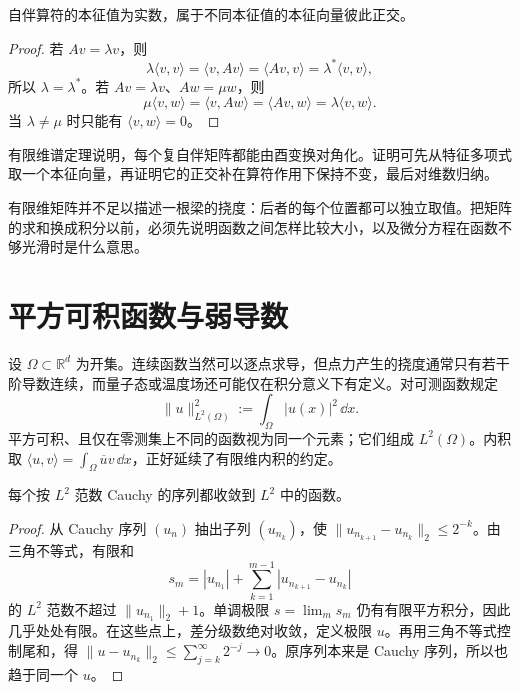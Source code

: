 \begin{proposition}[自伴算符的基本谱性质]
自伴算符的本征值为实数，属于不同本征值的本征向量彼此正交。
\end{proposition}

\begin{proof}
若 \(Av=\lambda v\)，则
\[
\lambda\langle v,v\rangle
=\langle v,Av\rangle
=\langle Av,v\rangle
=\lambda^*\langle v,v\rangle,
\]
所以 \(\lambda=\lambda^*\)。若 \(Av=\lambda v\)、\(Aw=\mu w\)，则
\[
\mu\langle v,w\rangle
=\langle v,Aw\rangle
=\langle Av,w\rangle
=\lambda\langle v,w\rangle.
\]
当 \(\lambda\ne\mu\) 时只能有 \(\langle v,w\rangle=0\)。
\end{proof}

有限维谱定理说明，每个复自伴矩阵都能由酉变换对角化。证明可先从特征多项式取一个本征向量，再证明它的正交补在算符作用下保持不变，最后对维数归纳。

有限维矩阵并不足以描述一根梁的挠度：后者的每个位置都可以独立取值。把矩阵的求和换成积分以前，必须先说明函数之间怎样比较大小，以及微分方程在函数不够光滑时是什么意思。

\section{平方可积函数与弱导数}
\label{sec:advanced-weak-derivative}

设 \(\Omega\subset\mathbb R^d\) 为开集。连续函数当然可以逐点求导，但点力产生的挠度通常只有若干阶导数连续，而量子态或温度场还可能仅在积分意义下有定义。对可测函数规定
\[
 \|u\|_{L^2(\Omega)}^2:=\int_\Omega |u(x)|^2\,\dd x.
\]
平方可积、且仅在零测集上不同的函数视为同一个元素；它们组成 \(L^2(\Omega)\)。内积取
\(\langle u,v\rangle=\int_\Omega\overline u v\,\dd x\)，正好延续了有限维内积的约定。

\begin{proposition}[\(L^2\) 的完备性]
每个按 \(L^2\) 范数 Cauchy 的序列都收敛到 \(L^2\) 中的函数。
\end{proposition}

\begin{proof}
从 Cauchy 序列 \((u_n)\) 抽出子列 \((u_{n_k})\)，使
\(\|u_{n_{k+1}}-u_{n_k}\|_2\le 2^{-k}\)。由三角不等式，有限和
\[
 s_m=|u_{n_1}|+\sum_{k=1}^{m-1}|u_{n_{k+1}}-u_{n_k}|
\]
的 \(L^2\) 范数不超过 \(\|u_{n_1}\|_2+1\)。单调极限
\(s=\lim_m s_m\) 仍有有限平方积分，因此几乎处处有限。在这些点上，差分级数绝对收敛，定义极限 \(u\)。再用三角不等式控制尾和，得
\(\|u-u_{n_k}\|_2\le\sum_{j=k}^{\infty}2^{-j}\to0\)。原序列本来是 Cauchy 序列，所以也趋于同一个 \(u\)。
\end{proof}

